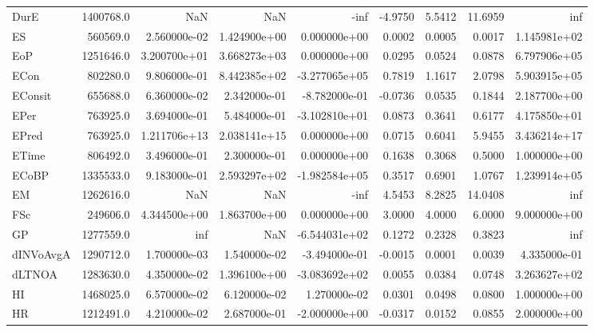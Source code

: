 \begin{tabular}{lrrrrrrrr}
DurE      &  1400768.0 &           NaN &           NaN &          -inf &    -4.9750 &     5.5412 &    11.6959 &           inf \\
ES        &   560569.0 &  2.560000e-02 &  1.424900e+00 &  0.000000e+00 &     0.0002 &     0.0005 &     0.0017 &  1.145981e+02 \\
EoP       &  1251646.0 &  3.200700e+01 &  3.668273e+03 &  0.000000e+00 &     0.0295 &     0.0524 &     0.0878 &  6.797906e+05 \\
ECon      &   802280.0 &  9.806000e-01 &  8.442385e+02 & -3.277065e+05 &     0.7819 &     1.1617 &     2.0798 &  5.903915e+05 \\
EConsit   &   655688.0 &  6.360000e-02 &  2.342000e-01 & -8.782000e-01 &    -0.0736 &     0.0535 &     0.1844 &  2.187700e+00 \\
EPer      &   763925.0 &  3.694000e-01 &  5.484000e-01 & -3.102810e+01 &     0.0873 &     0.3641 &     0.6177 &  4.175850e+01 \\
EPred     &   763925.0 &  1.211706e+13 &  2.038141e+15 &  0.000000e+00 &     0.0715 &     0.6041 &     5.9455 &  3.436214e+17 \\
ETime     &   806492.0 &  3.496000e-01 &  2.300000e-01 &  0.000000e+00 &     0.1638 &     0.3068 &     0.5000 &  1.000000e+00 \\
ECoBP     &  1335533.0 &  9.183000e-01 &  2.593297e+02 & -1.982584e+05 &     0.3517 &     0.6901 &     1.0767 &  1.239914e+05 \\
EM        &  1262616.0 &           NaN &           NaN &          -inf &     4.5453 &     8.2825 &    14.0408 &           inf \\
FSc       &   249606.0 &  4.344500e+00 &  1.863700e+00 &  0.000000e+00 &     3.0000 &     4.0000 &     6.0000 &  9.000000e+00 \\
GP        &  1277559.0 &           inf &           NaN & -6.544031e+02 &     0.1272 &     0.2328 &     0.3823 &           inf \\
dINVoAvgA &  1290712.0 &  1.700000e-03 &  1.540000e-02 & -3.494000e-01 &    -0.0015 &     0.0001 &     0.0039 &  4.335000e-01 \\
dLTNOA    &  1283630.0 &  4.350000e-02 &  1.396100e+00 & -3.083692e+02 &     0.0055 &     0.0384 &     0.0748 &  3.263627e+02 \\
HI        &  1468025.0 &  6.570000e-02 &  6.120000e-02 &  1.270000e-02 &     0.0301 &     0.0498 &     0.0800 &  1.000000e+00 \\
HR        &  1212491.0 &  4.210000e-02 &  2.687000e-01 & -2.000000e+00 &    -0.0317 &     0.0152 &     0.0855 &  2.000000e+00 \\

\end{tabular}
